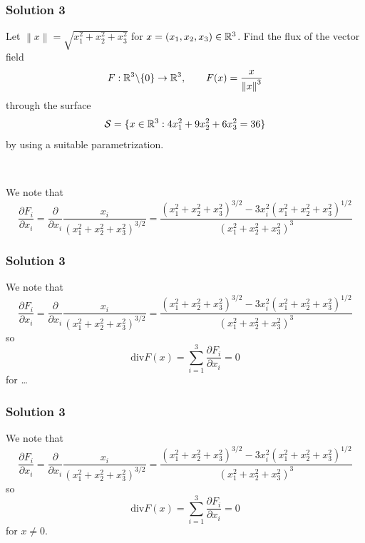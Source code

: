 \documentclass[10pt, t, allowdisplaybreaks]{beamer}
\newcommand{\nullspacesmall}{~\vspace{1em}}
\begin{document}
\begin{frame}
    \frametitle{Solution 3}
    \par Let $\left\lVert x\right\rVert = \sqrt{x_1^2+x_2^2+x_3^2}$ for $x = (x_1, x_2, x_3) \in \mathbb{R}^3$. Find the flux of the vector field
    \begin{equation*}
        F:\mathbb{R}^3\backslash\{0\}\rightarrow\mathbb{R}^3, \qquad F(x) = \frac{x}{\left\lVert x\right\rVert^3 }
    \end{equation*}
    through the surface 
    \begin{equation*}
        \mathcal{S} = \{x\in \mathbb{R}^3: 4x_1^2 + 9x_2^2 + 6x_3^2 = 36\}
    \end{equation*}
    by using a suitable parametrization. 

    \nullspacesmall
    
    \par We note that 
    \begin{equation*}
        \frac{\partial F_i}{\partial x_i} = \frac{\partial }{\partial x_i}\frac{x_i}{(x_1^2+x_2^2+x_3^2)^{3/2}} = \frac{(x_1^2+x_2^2+x_3^2)^{3/2} - 3x_i^2(x_1^2+x_2^2+x_3^2)^{1/2}}{(x_1^2+x_2^2+x_3^2)^{3}}
    \end{equation*}
\end{frame}
\begin{frame}
    \frametitle{Solution 3}
    \par We note that 
    \begin{equation*}
        \frac{\partial F_i}{\partial x_i} = \frac{\partial }{\partial x_i}\frac{x_i}{(x_1^2+x_2^2+x_3^2)^{3/2}} = \frac{(x_1^2+x_2^2+x_3^2)^{3/2} - 3x_i^2(x_1^2+x_2^2+x_3^2)^{1/2}}{(x_1^2+x_2^2+x_3^2)^{3}}
    \end{equation*}
    so 
    \begin{equation*}
        \text{div}F(x) = \sum^3_{i = 1}\frac{\partial F_i}{\partial x_i} = 0
    \end{equation*}
    for \dots
\end{frame}
\begin{frame}
    \frametitle{Solution 3}
    \par We note that 
    \begin{equation*}
        \frac{\partial F_i}{\partial x_i} = \frac{\partial }{\partial x_i}\frac{x_i}{(x_1^2+x_2^2+x_3^2)^{3/2}} = \frac{(x_1^2+x_2^2+x_3^2)^{3/2} - 3x_i^2(x_1^2+x_2^2+x_3^2)^{1/2}}{(x_1^2+x_2^2+x_3^2)^{3}}
    \end{equation*}
    so 
    \begin{equation*}
        \text{div}F(x) = \sum^3_{i = 1}\frac{\partial F_i}{\partial x_i} = 0
    \end{equation*}
    for $x\neq 0$.
\end{frame}
\end{document}

